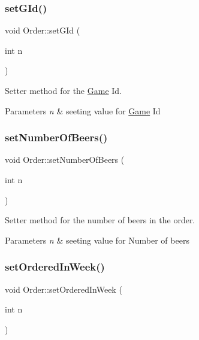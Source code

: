 \subsubsection{\texorpdfstring{set\+G\+Id()}{setGId()}}
{\footnotesize\ttfamily void Order\+::set\+G\+Id (\begin{DoxyParamCaption}\item[{int}]{n }\end{DoxyParamCaption})}



Setter method for the \hyperlink{class_game}{Game} Id. 


\begin{DoxyParams}{Parameters}
{\em n} & seeting value for \hyperlink{class_game}{Game} Id \\
\hline
\end{DoxyParams}
\mbox{\label{class_order_a5df5676cf7fc84374b5bdb5789aaf2f5}} 
\subsubsection{\texorpdfstring{set\+Number\+Of\+Beers()}{setNumberOfBeers()}}
{\footnotesize\ttfamily void Order\+::set\+Number\+Of\+Beers (\begin{DoxyParamCaption}\item[{int}]{n }\end{DoxyParamCaption})}



Setter method for the number of beers in the order. 


\begin{DoxyParams}{Parameters}
{\em n} & seeting value for Number of beers \\
\hline
\end{DoxyParams}
\mbox{\label{class_order_aba9a5987294110e6f6dea45feb88c31a}} 
\subsubsection{\texorpdfstring{set\+Ordered\+In\+Week()}{setOrderedInWeek()}}
{\footnotesize\ttfamily void Order\+::set\+Ordered\+In\+Week (\begin{DoxyParamCaption}\item[{int}]{n }\end{DoxyParamCaption})}



